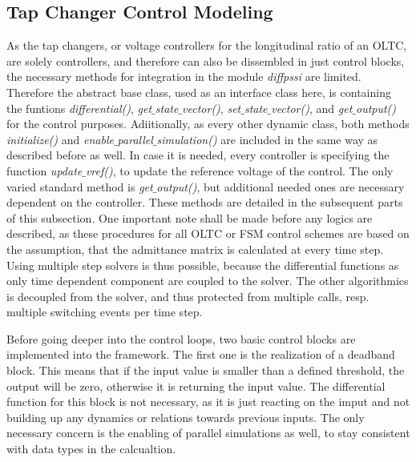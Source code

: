 

\subsection{Tap Changer Control Modeling}
\label{sec:modeling-tap-changer-control}

As the tap changers, or voltage controllers for the longitudinal ratio of an \acs{OLTC}, are solely controllers, and therefore can also be dissembled in just control blocks, the necessary methods for integration in the module \textit{diffpssi} are limited.
Therefore the abstract base class, used as an interface class here, is containing the funtions \textit{differential()}, \textit{get$\_$state$\_$vector()}, \textit{set$\_$state$\_$vector()}, and \textit{get$\_$output()} for the control purposes.
Adiitionally, as every other dynamic class, both methods \textit{initialize()} and \textit{enable$\_$parallel$\_$simulation()} are included in the same way as described before as well.
In case it is needed, every controller is specifying the function \textit{update$\_$vref()}, to update the reference voltage of the control. 
The only varied standard method is \textit{get$\_$output()}, but additional needed ones are necessary dependent on the controller.
These methods are detailed in the subsequent parts of this subsection.
One important note shall be made before any logics are described, as these procedures for all \acs{OLTC} or \acs{FSM} control schemes are based on the assumption, that the admittance matrix is calculated at every time step.
Using multiple step solvers is thus possible, because the differential functions as only time dependent component are coupled to the solver.
The other algorithmics is decoupled from the solver, and thus protected from multiple calls, resp. multiple switching events per time step.

Before going deeper into the control loops, two basic control blocks are implemented into the framework.
The first one is the realization of a deadband block.
This means that if the input value is smaller than a defined threshold, the output will be zero, otherwise it is returning the input value.
The differential function for this block is not necessary, as it is just reacting on the imput and not building up any dynamics or relations towards previous inputs.
The only necessary concern is the enabling of parallel simulations as well, to stay consistent with data types in the calcualtion.


